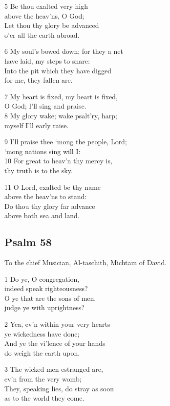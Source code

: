 5 Be thou exalted very high\\
above the heav’ns, O God;\\
Let thou thy glory be advanced\\
o’er all the earth abroad.

6 My soul’s bowed down; for they a net\\
have laid, my steps to snare:\\
Into the pit which they have digged\\
for me, they fallen are.

7 My heart is fixed, my heart is fixed,\\
O God; I’ll sing and praise.\\
8 My glory wake; wake psalt’ry, harp;\\
myself I’ll early raise.

9 I’ll praise thee ‘mong the people, Lord;\\
‘mong nations sing will I:\\
10 For great to heav’n thy mercy is,\\
thy truth is to the sky.

11 O Lord, exalted be thy name\\
above the heav’ns to stand:\\
Do thou thy glory far advance\\
above both sea and land.

\begin{center}
\quad{}\quad{}
\end{center}

\subsection*{Psalm 58}

To the chief Musician, Al-taschith, Michtam of David.

1 Do ye, O congregation,\\
indeed speak righteousness?\\
O ye that are the sons of men,\\
judge ye with uprightness?

2 Yea, ev’n within your very hearts\\
ye wickedness have done;\\
And ye the vi’lence of your hands\\
do weigh the earth upon.

3 The wicked men estranged are,\\
ev’n from the very womb;\\
They, speaking lies, do stray as soon\\
as to the world they come.

